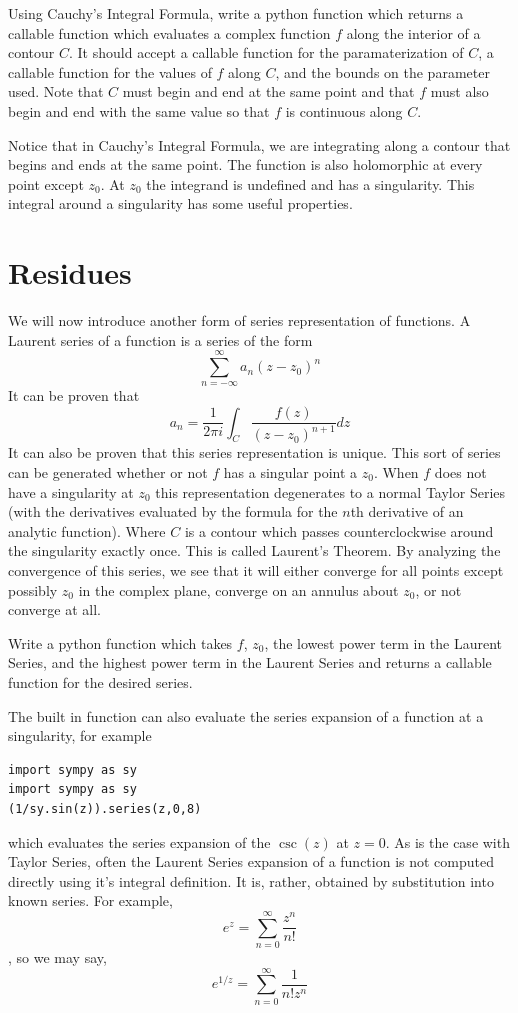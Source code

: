 \begin{problem}
Using Cauchy's Integral Formula, write a python function which returns a callable function which evaluates a complex function $f$ along the interior of a contour $C$. It should accept a callable function for the paramaterization of $C$, a callable function for the values of $f$ along $C$, and the bounds on the parameter used. Note that $C$ must begin and end at the same point and that $f$ must also begin and end with the same value so that $f$ is continuous along $C$.
\end{problem}

Notice that in Cauchy's Integral Formula, we are integrating along a contour that begins and ends at the same point.
The function is also holomorphic at every point except $z_0$. At $z_0$ the integrand is undefined and has a singularity.
This integral around a singularity has some useful properties.

\section*{Residues}

We will now introduce another form of series representation of functions.
A Laurent series of a function is a series of the form $$\sum_{n= -\infty}^{\infty} a_n (z-z_0)^n$$
It can be proven that 
$$a_n = \frac{1}{2\pi i} \int_C \frac{f(z)}{(z-z_0)^{n+1}} dz$$ 
It can also be proven that this series representation is unique.
This sort of series can be generated whether or not $f$ has a singular point a $z_0$.
When $f$ does not have a singularity at $z_0$ this representation degenerates to a normal Taylor Series (with the derivatives evaluated by the formula for the $n$th derivative of an analytic function).
Where $C$ is a contour which passes counterclockwise around the singularity exactly once.
This is called Laurent's Theorem.
By analyzing the convergence of this series, we see that it will either converge for all points except possibly $z_0$ in the complex plane, converge on an annulus about $z_0$, or not converge at all.

\begin{problem}
Write a python function which takes $f$, $z_0$, the lowest power term in the Laurent Series, and the highest power term in the Laurent Series and returns a callable function for the desired series.
\end{problem}

The built in function  can also evaluate the series expansion of a function at a singularity, for example
\begin{lstlisting}[style=python]
import sympy as sy
import sympy as sy
(1/sy.sin(z)).series(z,0,8)
\end{lstlisting}
which evaluates the series expansion of the $\csc(z)$ at $z=0$. 
As is the case with Taylor Series, often the Laurent Series expansion of a function is not computed directly using it's integral definition.
It is, rather, obtained by substitution into known series.
For example, 
$$e^z = \sum_{n=0}^{\infty} \frac{z^n}{n!}$$, so we may say,
$$e^{1/z} = \sum_{n=0}^{\infty} \frac{1}{n! z^n}$$

